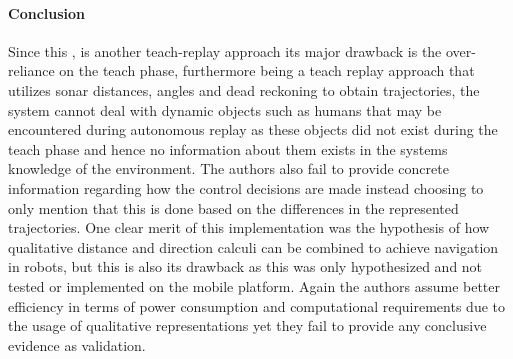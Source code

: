 	
	\paragraph{Conclusion}Since this \cite{musto1999qualitative}, is another teach-replay approach its major drawback is the over-reliance on the teach phase, furthermore being a teach replay approach that utilizes sonar distances, angles and dead reckoning to obtain trajectories, the system cannot deal with dynamic objects such as humans that may be encountered during autonomous replay as these objects did not exist during the teach phase and hence no information about them exists in the systems knowledge of the environment. The authors also fail to provide concrete information regarding how the control decisions are made instead choosing to only mention that this is done based on the differences in the represented trajectories. One clear merit of this implementation was the hypothesis of how qualitative distance and direction calculi can be combined to achieve navigation in robots, but this is also its drawback as this was only hypothesized and not tested or implemented on the mobile platform. Again the authors assume better efficiency in terms of power consumption and computational requirements due to the usage of qualitative representations yet they fail to provide any conclusive evidence as validation.

